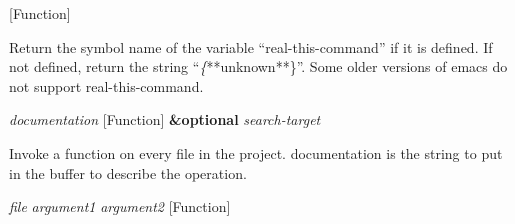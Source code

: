 \vspace{1em}
\noindent
{}
\usebox{\funcname}
 \hfill [Function]

\begin{doc-string}
Return the symbol name of the variable ``real-this-command'' if it is defined.
If not defined, return the string ``\emph\{**unknown**\}''.  Some older versions of emacs
do not support real-this-command.
\end{doc-string}

\vspace{1em}
\noindent
{}
\usebox{\funcname}\emph{documentation}
 \hfill [Function]
\hspace*{\wd\funcname}\textbf{\&optional} \emph{search-target}
\hspace*{\wd\funcname}

\begin{doc-string}
Invoke a function on every file in the project.
documentation is the string to put in the buffer to describe the operation.
\end{doc-string}

\vspace{1em}
\noindent
{}
\usebox{\funcname}\emph{file} \emph{argument1} \emph{argument2}
 \hfill [Function]

